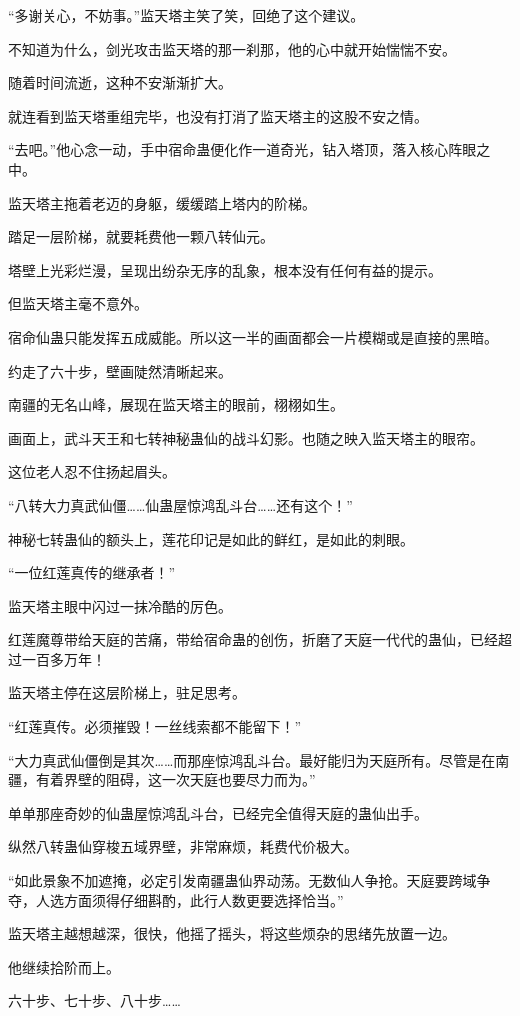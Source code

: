 \begin{this_body}
“多谢关心，不妨事。”监天塔主笑了笑，回绝了这个建议。

不知道为什么，剑光攻击监天塔的那一刹那，他的心中就开始惴惴不安。

随着时间流逝，这种不安渐渐扩大。

就连看到监天塔重组完毕，也没有打消了监天塔主的这股不安之情。

“去吧。”他心念一动，手中宿命蛊便化作一道奇光，钻入塔顶，落入核心阵眼之中。

监天塔主拖着老迈的身躯，缓缓踏上塔内的阶梯。

踏足一层阶梯，就要耗费他一颗八转仙元。

塔壁上光彩烂漫，呈现出纷杂无序的乱象，根本没有任何有益的提示。

但监天塔主毫不意外。

宿命仙蛊只能发挥五成威能。所以这一半的画面都会一片模糊或是直接的黑暗。

约走了六十步，壁画陡然清晰起来。

南疆的无名山峰，展现在监天塔主的眼前，栩栩如生。

画面上，武斗天王和七转神秘蛊仙的战斗幻影。也随之映入监天塔主的眼帘。

这位老人忍不住扬起眉头。

“八转大力真武仙僵……仙蛊屋惊鸿乱斗台……还有这个！”

神秘七转蛊仙的额头上，莲花印记是如此的鲜红，是如此的刺眼。

“一位红莲真传的继承者！”

监天塔主眼中闪过一抹冷酷的厉色。

红莲魔尊带给天庭的苦痛，带给宿命蛊的创伤，折磨了天庭一代代的蛊仙，已经超过一百多万年！

监天塔主停在这层阶梯上，驻足思考。

“红莲真传。必须摧毁！一丝线索都不能留下！”

“大力真武仙僵倒是其次……而那座惊鸿乱斗台。最好能归为天庭所有。尽管是在南疆，有着界壁的阻碍，这一次天庭也要尽力而为。”

单单那座奇妙的仙蛊屋惊鸿乱斗台，已经完全值得天庭的蛊仙出手。

纵然八转蛊仙穿梭五域界壁，非常麻烦，耗费代价极大。

“如此景象不加遮掩，必定引发南疆蛊仙界动荡。无数仙人争抢。天庭要跨域争夺，人选方面须得仔细斟酌，此行人数更要选择恰当。”

监天塔主越想越深，很快，他摇了摇头，将这些烦杂的思绪先放置一边。

他继续拾阶而上。

六十步、七十步、八十步……


\end{this_body}
